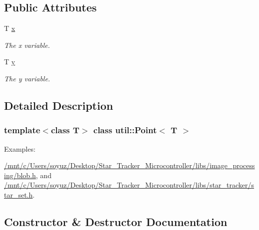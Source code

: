 \subsection*{Public Attributes}
\begin{DoxyCompactItemize}
\item 
\mbox{\label{classutil_1_1Point_aacd055853a71c08675e1210ee7d7777b}} 
T \hyperlink{classutil_1_1Point_aacd055853a71c08675e1210ee7d7777b}{x}
\begin{DoxyCompactList}\small\item\em The x variable. \end{DoxyCompactList}\item 
\mbox{\label{classutil_1_1Point_abf5df9373ece02d9b87f367cf12dd319}} 
T \hyperlink{classutil_1_1Point_abf5df9373ece02d9b87f367cf12dd319}{y}
\begin{DoxyCompactList}\small\item\em The y variable. \end{DoxyCompactList}\end{DoxyCompactItemize}


\subsection{Detailed Description}
\subsubsection*{template$<$class T$>$\newline
class util\+::\+Point$<$ T $>$}

\begin{Desc}
\item[Examples\+: ]\par
\hyperlink{_2mnt_2c_2Users_2soyuz_2Desktop_2Star_Tracker_Microcontroller_2libs_2image_processing_2blob_8h-example}{/mnt/c/\+Users/soyuz/\+Desktop/\+Star\+\_\+\+Tracker\+\_\+\+Microcontroller/libs/image\+\_\+processing/blob.\+h}, and \hyperlink{_2mnt_2c_2Users_2soyuz_2Desktop_2Star_Tracker_Microcontroller_2libs_2star_tracker_2star_set_8h-example}{/mnt/c/\+Users/soyuz/\+Desktop/\+Star\+\_\+\+Tracker\+\_\+\+Microcontroller/libs/star\+\_\+tracker/star\+\_\+set.\+h}.\end{Desc}


\subsection{Constructor \& Destructor Documentation}
\mbox{\label{classutil_1_1Point_a805a2536f7312ac891a4c729174c1514}} 
